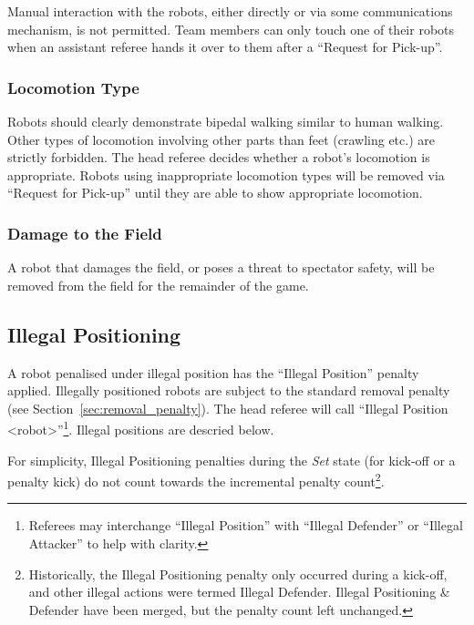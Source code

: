 \documentclass[12pt]{article}
\newcommand{\cf}{see\xspace}
\begin{document}
Manual interaction with the robots, either directly or via some communications mechanism, is not permitted.
Team members can only touch one of their robots when an assistant referee hands it over to them after a ``Request for Pick-up''.

\subsubsection{Locomotion Type}
\label{sec:locomotion_type}

Robots should clearly demonstrate bipedal walking similar to human walking. Other types of locomotion involving other parts than feet (crawling etc.) are strictly forbidden.
The head referee decides whether a robot's locomotion is appropriate. Robots using inappropriate locomotion types will be removed via ``Request for Pick-up'' until they are able to show appropriate locomotion.

\subsubsection{Damage to the Field}
\label{sec:damage}

A robot that damages the field, or poses a threat to spectator safety, will be removed from the field for the remainder of the game.

\subsection{Illegal Positioning}
\label{sec:illegal_positioning}

A robot penalised under illegal position has the ``Illegal Position'' penalty applied. Illegally positioned robots are subject to the standard removal penalty (\cf Section~\ref{sec:removal_penalty}).
The head referee will call ``Illegal Position  \textless robot\textgreater''\footnote{Referees may interchange ``Illegal Position'' with ``Illegal Defender'' or ``Illegal Attacker'' to help with clarity.}.
Illegal positions are descried below.

For simplicity, Illegal Positioning penalties during the \textit{Set} state (for kick-off or a penalty kick) do not count towards the incremental penalty count\footnote{Historically, the Illegal Positioning penalty only occurred during a kick-off, and other illegal actions were termed Illegal Defender. Illegal Positioning \& Defender have been merged, but the penalty count left unchanged.}.
\end{document}

